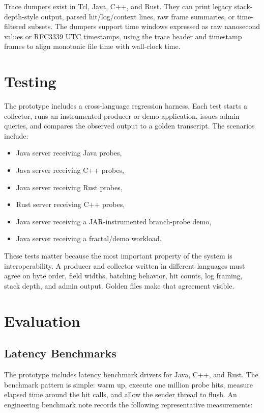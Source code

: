 \documentclass[11pt]{article}
\begin{document}
Trace dumpers exist in Tcl, Java, C++, and Rust. They can print legacy
stack-depth-style output, parsed hit/log/context lines, raw frame summaries, or
time-filtered subsets. The dumpers support time windows expressed as raw
nanosecond values or RFC3339 UTC timestamps, using the trace header and
timestamp frames to align monotonic file time with wall-clock time.

\section{Testing}

The prototype includes a cross-language regression harness. Each test starts a
collector, runs an instrumented producer or demo application, issues admin
queries, and compares the observed output to a golden transcript. The scenarios
include:

\begin{itemize}
  \item Java server receiving Java probes,
  \item Java server receiving C++ probes,
  \item Java server receiving Rust probes,
  \item Rust server receiving C++ probes,
  \item Java server receiving a JAR-instrumented branch-probe demo,
  \item Java server receiving a fractal/demo workload.
\end{itemize}

These tests matter because the most important property of the system is
interoperability. A producer and collector written in different languages must
agree on byte order, field widths, batching behavior, hit counts, log framing,
stack depth, and admin output. Golden files make that agreement visible.

\section{Evaluation}

\subsection{Latency Benchmarks}

The prototype includes latency benchmark drivers for Java, C++, and Rust. The
benchmark pattern is simple: warm up, execute one million probe hits, measure
elapsed time around the hit calls, and allow the sender thread to flush. An
engineering benchmark note records the following representative measurements:
\end{document}
